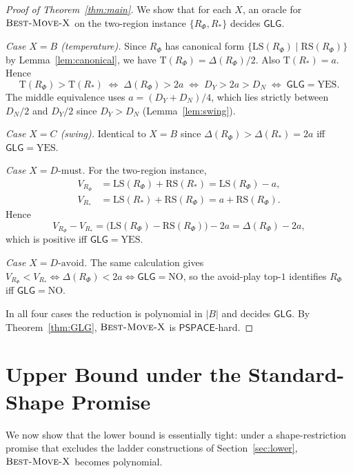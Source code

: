 \documentclass[11pt,a4paper]{amsart}
\theoremstyle{definition}
\theoremstyle{remark}
\newcommand{\LS}{\mathrm{LS}}
\newcommand{\RS}{\mathrm{RS}}
\newcommand{\Tt}{\mathrm{T}}
\newcommand{\PSPACE}{\mathsf{PSPACE}}
\newcommand{\GLG}{\mathsf{GLG}}
\newcommand{\BMX}{\textsc{Best-Move-X}}
\begin{document}
\begin{proof}[Proof of Theorem~\ref{thm:main}]
We show that for each $X$, an oracle for $\BMX$ on the two-region
instance $\{R_\Phi, R_*\}$ decides $\GLG$.

\emph{Case $X = B$ (temperature).} Since $R_\Phi$ has canonical form
$\{\LS(R_\Phi) \mid \RS(R_\Phi)\}$ by Lemma~\ref{lem:canonical}, we have
$\Tt(R_\Phi) = \Delta(R_\Phi) / 2$. Also $\Tt(R_*) = a$. Hence
\[
  \Tt(R_\Phi) > \Tt(R_*)
  \;\Longleftrightarrow\;
  \Delta(R_\Phi) > 2a
  \;\Longleftrightarrow\;
  D_Y > 2a > D_N
  \;\Longleftrightarrow\;
  \GLG = \mathrm{YES}.
\]
The middle equivalence uses $a = (D_Y + D_N)/4$, which lies strictly
between $D_N/2$ and $D_Y/2$ since $D_Y > D_N$ (Lemma~\ref{lem:swing}).

\emph{Case $X = C$ (swing).} Identical to $X = B$ since
$\Delta(R_\Phi) > \Delta(R_*) = 2a$ iff $\GLG = \mathrm{YES}$.

\emph{Case $X = D\text{-must}$.} For the two-region instance,
\begin{align*}
  V_{R_\Phi} &= \LS(R_\Phi) + \RS(R_*) = \LS(R_\Phi) - a,
  \\
  V_{R_*} &= \LS(R_*) + \RS(R_\Phi) = a + \RS(R_\Phi).
\end{align*}
Hence
\[
  V_{R_\Phi} - V_{R_*}
  = \bigl(\LS(R_\Phi) - \RS(R_\Phi)\bigr) - 2a
  = \Delta(R_\Phi) - 2a,
\]
which is positive iff $\GLG = \mathrm{YES}$.

\emph{Case $X = D\text{-avoid}$.} The same calculation gives
$V_{R_\Phi} < V_{R_*} \iff \Delta(R_\Phi) < 2a \iff \GLG = \mathrm{NO}$,
so the avoid-play top-$1$ identifies $R_\Phi$ iff $\GLG = \mathrm{NO}$.

In all four cases the reduction is polynomial in $|B|$ and decides
$\GLG$. By Theorem~\ref{thm:GLG}, $\BMX$ is $\PSPACE$-hard.
\end{proof}

\section{Upper Bound under the Standard-Shape Promise}\label{sec:upper}

We now show that the lower bound is essentially tight: under a
shape-restriction promise that excludes the ladder constructions of
Section~\ref{sec:lower}, $\BMX$ becomes polynomial.
\end{document}
